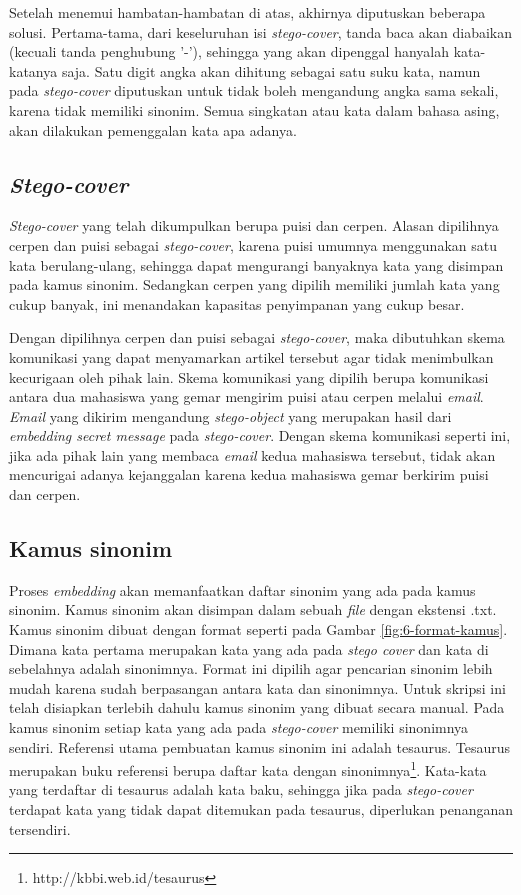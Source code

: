 Setelah menemui hambatan-hambatan di atas, akhirnya diputuskan beberapa solusi. Pertama-tama, dari keseluruhan isi \textit{stego-cover}, tanda baca akan diabaikan (kecuali tanda penghubung '-'), sehingga yang akan dipenggal hanyalah kata-katanya saja. Satu digit angka akan dihitung sebagai satu suku kata, namun pada \textit{stego-cover} diputuskan untuk tidak boleh mengandung angka sama sekali, karena tidak memiliki sinonim. Semua singkatan atau kata dalam bahasa asing, akan dilakukan pemenggalan kata apa adanya.

\subsection{\textit{Stego-cover}}
\textit{Stego-cover} yang telah dikumpulkan berupa puisi dan cerpen. Alasan dipilihnya cerpen dan puisi sebagai \textit{stego-cover}, karena puisi umumnya menggunakan satu kata berulang-ulang, sehingga dapat mengurangi banyaknya kata yang disimpan pada kamus sinonim. Sedangkan cerpen yang dipilih memiliki jumlah kata yang cukup banyak, ini menandakan kapasitas penyimpanan yang cukup besar.

Dengan dipilihnya cerpen dan puisi sebagai \textit{stego-cover}, maka dibutuhkan skema komunikasi yang dapat menyamarkan artikel tersebut agar tidak menimbulkan kecurigaan oleh pihak lain. Skema komunikasi yang dipilih berupa komunikasi antara dua mahasiswa yang gemar mengirim puisi atau cerpen melalui \textit{email}. \textit{Email} yang dikirim mengandung \textit{stego-object} yang merupakan hasil dari \textit{embedding secret message} pada \textit{stego-cover}. Dengan skema komunikasi seperti ini, jika ada pihak lain yang membaca \textit{email} kedua mahasiswa tersebut, tidak akan mencurigai adanya kejanggalan karena kedua mahasiswa gemar berkirim puisi dan cerpen.

\subsection{Kamus sinonim}
\label{sec:kamus_sinonim}
Proses \textit{embedding} akan memanfaatkan daftar sinonim yang ada pada kamus sinonim. Kamus sinonim akan disimpan dalam sebuah \textit{file} dengan ekstensi .txt. Kamus sinonim dibuat dengan format seperti pada Gambar \ref{fig:6-format-kamus}. Dimana kata pertama merupakan kata yang ada pada \textit{stego cover} dan kata di sebelahnya adalah sinonimnya. Format ini dipilih agar pencarian sinonim lebih mudah karena sudah berpasangan antara kata dan sinonimnya. Untuk skripsi ini telah disiapkan terlebih dahulu kamus sinonim yang dibuat secara manual. Pada kamus sinonim setiap kata yang ada pada \textit{stego-cover} memiliki sinonimnya sendiri. Referensi utama pembuatan kamus sinonim ini adalah tesaurus. Tesaurus merupakan buku referensi berupa daftar kata dengan sinonimnya\footnote{http://kbbi.web.id/tesaurus}. Kata-kata yang terdaftar di tesaurus adalah kata baku, sehingga jika pada \textit{stego-cover} terdapat kata yang tidak dapat ditemukan pada tesaurus, diperlukan penanganan tersendiri.

